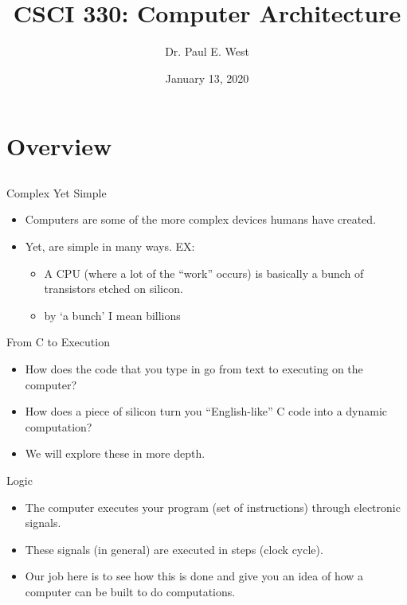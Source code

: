 \documentclass{beamer}
\title{CSCI 330: Computer Architecture}
\author{Dr. Paul E. West}
\institute{
  Department of Computer Science\\
  Charleston Southern University
}
\date{January 13, 2020}
\begin{document}
\begin{frame}
  \titlepage
\end{frame}

\section{Overview}
\subsection{}

\begin{frame}{Complex Yet Simple}
\begin{itemize}
\item Computers are some of the more complex devices humans have created.
\item Yet, are simple in many ways.  EX:
\begin{itemize}
\item A CPU (where a lot of the ``work'' occurs) is basically a bunch of transistors etched on silicon.
\item by `a bunch' I mean billions
\end{itemize}
\end{itemize}
\end{frame}

\begin{frame}{From C to Execution}
\begin{itemize}
\item How does the code that you type in go from text to executing on the computer?
\item How does a piece of silicon turn you ``English-like'' C code into a dynamic computation?
\item We will explore these in more depth.
\end{itemize}
\end{frame}

\begin{frame}{Logic}
\begin{itemize}
\item The computer executes your program (set of instructions) through electronic signals.
\item These signals (in general) are executed in steps (clock cycle).
\item Our job here is to see how this is done and give you an idea of how a computer can be built to do computations.
\end{itemize}
\end{frame}
\end{document}

